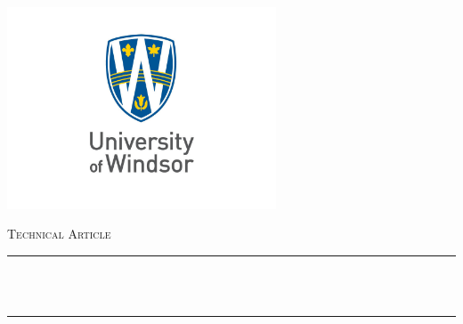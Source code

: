 \begin{titlepage}

    \newcommand{\HRule}{\rule{\linewidth}{0.5mm}} %
    
    \centering
    \includegraphics[width=8cm]{title/logo.jpg}\\[1cm] %

    
    \center %
    
    
    \textsc{\LARGE Technical Article}\\[1.5cm]
    \makeatletter
    \HRule \\[0.4cm]
    { \huge \bfseries \@title}\\[0.4cm] %
    \HRule \\[1.5cm]

    

\end{titlepage}
